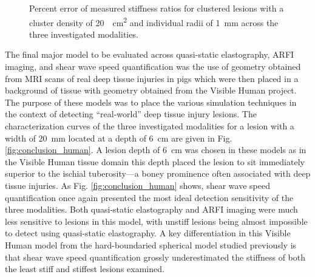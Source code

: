 			\begin{figure}[!htb]
				\centering
				\caption[Percent error of measured stiffness ratios for clustered lesions across the three investigated modalities]{Percent error of measured stiffness ratios for clustered lesions with a cluster density of \SI{20}{\per\cm\squared} and individual radii of \SI{1}{\mm} across the three investigated modalities.}
				\label{fig:conclusions_cluster_pd}
			\end{figure}

			The final major model to be evaluated across quasi-static elastography, ARFI imaging, and shear wave speed quantification was the use of geometry obtained from MRI scans of real deep tissue injuries in pigs which were then placed in a background of tissue with geometry obtained from the Visible Human project. The purpose of these models was to place the various simulation techniques in the context of detecting ``real-world'' deep tissue injury lesions. The characterization curves of the three investigated modalities for a lesion with a width of \SI{20}{\mm} located at a depth of \SI{6}{\cm} are given in Fig. \ref{fig:conclusion_human}. A lesion depth of \SI{6}{\cm} was chosen in these models as in the Visible Human tissue domain this depth placed the lesion to sit immediately superior to the ischial tuberosity---a boney prominence often associated with deep tissue injuries. As Fig. \ref{fig:conclusion_human} shows, shear wave speed quantification once again presented the most ideal detection sensitivity of the three modalities. Both quasi-static elastography and ARFI imaging were much less sensitive to lesions in this model, with unstiff lesions being almost impossible to detect using quasi-static elastography. A key differentiation in this Visible Human model from the hard-boundaried spherical model studied previously is that shear wave speed quantification grossly underestimated the stiffness of both the least stiff and stiffest lesions examined.

